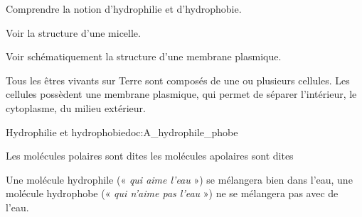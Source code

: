 \tetePremStssBiom
{}

\begin{objectifs}
  \item Comprendre la notion d'hydrophilie et d'hydrophobie.
  \item Voir la structure d'une micelle.
  \item Voir schématiquement la structure d'une membrane plasmique.
\end{objectifs}

\begin{contexte}
  Tous les êtres vivants sur Terre sont composés de une ou plusieurs cellules.
  Les cellules possèdent une membrane plasmique, qui permet de séparer l'intérieur, le cytoplasme, du milieu extérieur.
  
\end{contexte}


\begin{doc}{Hydrophilie et hydrophobie}{doc:A_hydrophile_phobe}
  \begin{importants}
    Les molécules polaires sont dites  les molécules apolaires sont dites 
  \end{importants}
  Une molécule hydrophile («\textit{ qui aime l'eau} ») se mélangera bien dans l'eau, une molécule hydrophobe (« \textit{qui n'aime pas l'eau} ») ne se mélangera pas avec de l'eau.
\end{doc}

